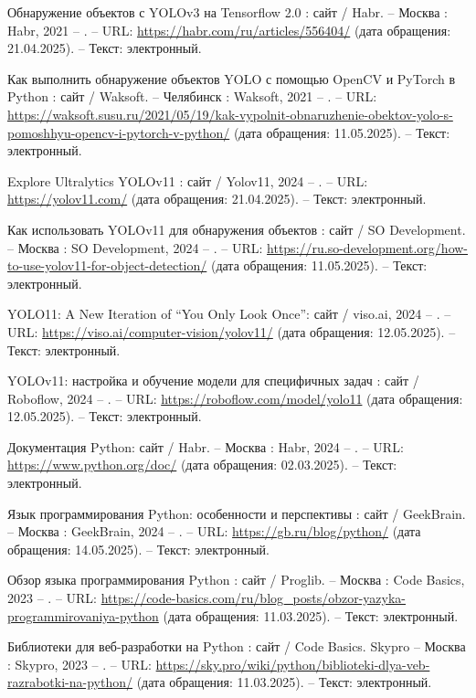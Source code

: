 \begin{thebibliography}{9}
	 Обнаружение объектов с YOLOv3 на Tensorflow 2.0 : сайт / Habr. – Москва : Habr, 2021 – . – URL: \url{https://habr.com/ru/articles/556404/} (дата обращения: 21.04.2025). – Текст: электронный.
	
	 Как выполнить обнаружение объектов YOLO с помощью OpenCV и PyTorch в Python : сайт / Waksoft. – Челябинск : Waksoft, 2021 – . – URL: \url{https://waksoft.susu.ru/2021/05/19/kak-vypolnit-obnaruzhenie-obektov-yolo-s-pomoshhyu-opencv-i-pytorch-v-python/} (дата обращения: 11.05.2025). – Текст: электронный.
	
	 Explore Ultralytics YOLOv11 : сайт / Yolov11, 2024 – . – URL: \url{https://yolov11.com/} (дата обращения: 21.04.2025). – Текст: электронный.
	
	 Как использовать YOLOv11 для обнаружения объектов : сайт / SO Development. – Москва : SO Development, 2024 – . – URL: \url{https://ru.so-development.org/how-to-use-yolov11-for-object-detection/} (дата обращения: 11.05.2025). – Текст: электронный.
	
	 YOLO11: A New Iteration of “You Only Look Once”: сайт / viso.ai, 2024 – . – URL: \url{https://viso.ai/computer-vision/yolov11/} (дата обращения: 12.05.2025). – Текст: электронный.
	
	 YOLOv11: настройка и обучение модели для специфичных задач : сайт / Roboflow, 2024 – . – URL: \url{https://roboflow.com/model/yolo11} (дата обращения: 12.05.2025). – Текст: электронный.

	 Документация Python: сайт / Habr. – Москва : Habr, 2024 – . – URL: \url{https://www.python.org/doc/} (дата обращения: 02.03.2025). – Текст: электронный.
	
	 Язык программирования Python: особенности и перспективы : сайт / GeekBrain. – Москва : GeekBrain, 2024 – . – URL: \url{https://gb.ru/blog/python/} (дата обращения: 14.05.2025). – Текст: электронный.
	
	 Обзор языка программирования Python : сайт / Proglib. – Москва : Code Basics, 2023 – . – URL: \url{https://code-basics.com/ru/blog_posts/obzor-yazyka-programmirovaniya-python} (дата обращения: 11.03.2025). – Текст: электронный.
	
	 Библиотеки для веб-разработки на Python : сайт / Code Basics. Skypro – Москва : Skypro, 2023 – . – URL: \url{https://sky.pro/wiki/python/biblioteki-dlya-veb-razrabotki-na-python/} (дата обращения: 11.03.2025). – Текст: электронный.


\end{thebibliography}
